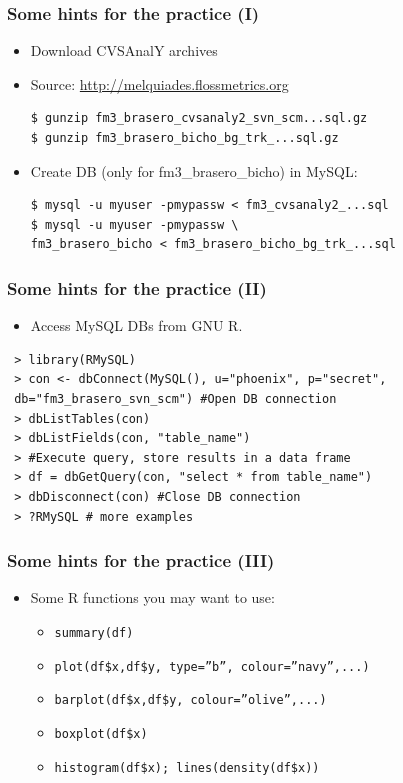 \documentclass{beamer}
\begin{document}

\begin{frame}[fragile]
\frametitle{Some hints for the practice (I)}
\begin{itemize}
\item Download CVSAnalY archives\\
\item Source: \url{http://melquiades.flossmetrics.org}
 \begin{verbatim}
$ gunzip fm3_brasero_cvsanaly2_svn_scm...sql.gz
$ gunzip fm3_brasero_bicho_bg_trk_...sql.gz
\end{verbatim}
\item Create DB (only for fm3\_brasero\_bicho) in MySQL:
\begin{verbatim}
$ mysql -u myuser -pmypassw < fm3_cvsanaly2_...sql
$ mysql -u myuser -pmypassw \
fm3_brasero_bicho < fm3_brasero_bicho_bg_trk_...sql
 \end{verbatim}
\end{itemize}
\end{frame}


\begin{frame}[fragile]
\frametitle{Some hints for the practice (II)}

\begin{itemize}
 \item Access MySQL DBs from GNU R.
\end{itemize}
\vspace{-0.5cm}
\begin{verbatim}
 > library(RMySQL)
 > con <- dbConnect(MySQL(), u="phoenix", p="secret",
 db="fm3_brasero_svn_scm") #Open DB connection
 > dbListTables(con)
 > dbListFields(con, "table_name")
 > #Execute query, store results in a data frame
 > df = dbGetQuery(con, "select * from table_name") 
 > dbDisconnect(con) #Close DB connection
 > ?RMySQL # more examples
\end{verbatim}

\end{frame}


\begin{frame}[fragile]
\frametitle{Some hints for the practice (III)}
\begin{itemize}
\item Some R functions you may want to use:
  \begin{itemize}
  \item \texttt{summary(df)}
  \item \texttt{plot(df\$x,df\$y, type=''b'', colour=''navy'',...)}
  \item \texttt{barplot(df\$x,df\$y, colour=''olive'',...)}
  \item \texttt{boxplot(df\$x)}
  \item \texttt{histogram(df\$x); lines(density(df\$x))}
  \end{itemize}
\end{itemize}
\end{frame}
\end{document}
